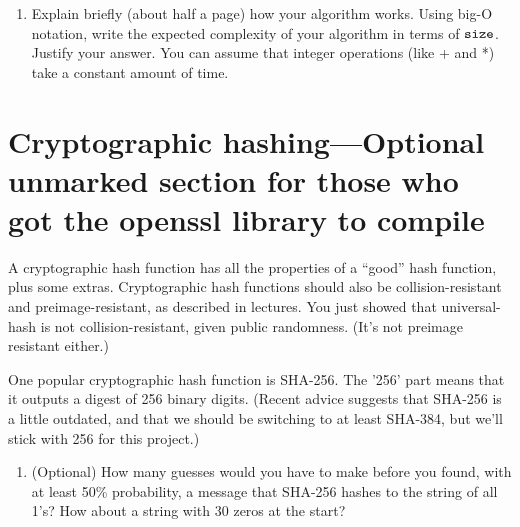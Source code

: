 \documentclass[11pt]{article}
\newcommand{\size}{{\tt size}}
\begin{document}
\begin{enumerate}[resume]
\item
    Explain briefly (about half a page) how your algorithm works.  Using big-O notation, write the expected complexity of your algorithm in terms of $\size$.
        Justify your answer.
        You can assume that integer operations (like + and *) take a constant amount of time.
\end{enumerate}

\section*{Cryptographic hashing---Optional unmarked section for those who got the openssl library to compile}
A cryptographic hash function has all the properties of a ``good'' hash function, plus some extras.
Cryptographic hash functions should also be collision-resistant and preimage-resistant,
as described in lectures.
You just showed that  universal-hash is not collision-resistant, given public randomness.
(It's not preimage resistant either.)

One popular cryptographic hash function is SHA-256.
The '256' part means that it outputs a digest of 256 binary digits.
(Recent advice suggests that SHA-256 is a little outdated,
and that we should be switching to at least SHA-384,
but we'll stick with 256 for this project.)

\begin{enumerate}[resume]
\item (Optional) How many guesses would you have to make before you found, with at least
    50\% probability, a message that SHA-256 hashes to the string of all 1's?
        How about a string with 30 zeros at the start?
\end{enumerate}
\end{document}
